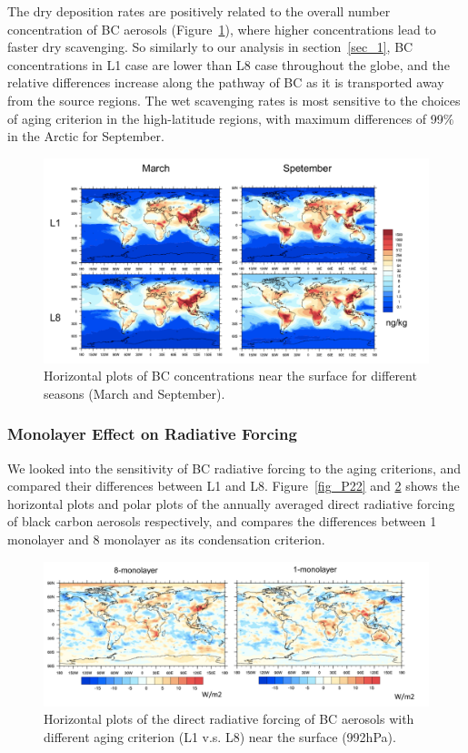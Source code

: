 \documentclass[12pt]{article}
\begin{document}
	The dry deposition rates are positively related to the overall number concentration of BC aerosols (Figure~\ref{fig_P21}), where higher concentrations lead to faster dry scavenging. So similarly to our analysis in section~\ref{sec_1}, BC concentrations in L1 case are lower than L8 case throughout the globe, and the relative differences increase along the pathway of BC as it is transported away from the source regions. The wet scavenging rates is most sensitive to the choices of aging criterion in the high-latitude regions, with maximum differences of 99$\%$ in the Arctic for September.  
	
	\begin{figure}[h] 
		\begin{center}
			\includegraphics[width = 1\textwidth]{Figure21}
			\caption[]{\label{fig_P21} Horizontal plots of BC concentrations near the surface for different seasons (March and September).}
		\end{center}
	\end{figure}
	
	
	\subsubsection{Monolayer Effect on Radiative Forcing }
	We looked into the sensitivity of BC radiative forcing to the aging criterions, and compared their differences between L1 and L8. Figure~\ref{fig_P22} and \ref{fig_P23} shows the horizontal plots and polar plots of the annually averaged direct radiative forcing of black carbon aerosols respectively, and compares the differences between 1 monolayer and 8 monolayer as its condensation criterion. 
	\begin{figure}[H] 
		\begin{center}
			\includegraphics[width = 1\textwidth]{Figure23}
			\caption[]{\label{fig_P23} Horizontal plots of the direct radiative forcing of BC aerosols with different aging criterion (L1 v.s. L8) near the surface (992hPa).}
		\end{center}
	\end{figure}
	
\end{document}
